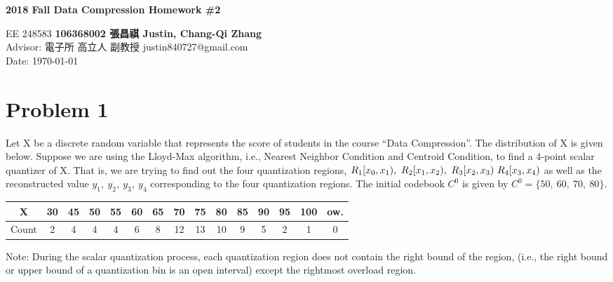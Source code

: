 \documentclass[a4paper, 11pt]{article}
\begin{document}
\noindent
\begin{center}
  \large\textbf{2018 Fall Data Compression Homework \#2} \\
\end{center}
\begin{CJK}{UTF8}{bsmi}
\normalsize EE 248583 \hfill \textbf{106368002 張昌祺 Justin, Chang-Qi Zhang} \\
Advisor: 電子所 高立人 副教授 \hfill justin840727@gmail.com \\
\null\hfill Date: \today \\
\end{CJK}

\section*{Problem 1}
Let X be a discrete random variable that represents the score of students in the course
“Data Compression”. The distribution of X is given below. Suppose we are using the
Lloyd-Max algorithm, i.e., Nearest Neighbor Condition and Centroid Condition, to find a
4-point scalar quantizer of X. That is, we are trying to find out the four quantization
regions, $R_{1}[x_0, x_1),~R_{2}[x_1, x_2),\\~R_{3}[x_2, x_3)~R_{4}[x_3, x_4)$ as well as the 
reconstructed value $y_1,~y_2,~y_3,~y_4$ corresponding to the four quantization regions. 
The initial codebook $C^0$ is given by $C^0=\{50,~60,~70,~80\}$.

\begin{center}
  \begin{tabular}{ |c|c|c|c|c|c|c|c|c|c|c|c|c|c|c| }
  \hline
   X     & 30 & 45 & 50 & 55 & 60 & 65 & 70 & 75 & 80 & 85 & 90 & 95 & 100 & ow. \\
   \hline 
   Count & 2  & 4  & 4  & 4  & 6  & 8  & 12 & 13 & 10 & 9  & 5  & 2  & 1   & 0 \\
   \hline
  \end{tabular}
  \end{center}
  Note: During the scalar quantization process, each quantization region does not contain the
  right bound of the region, (i.e., the right bound or upper bound of a quantization bin
  is an open interval) except the rightmost overload region.
\end{document}
